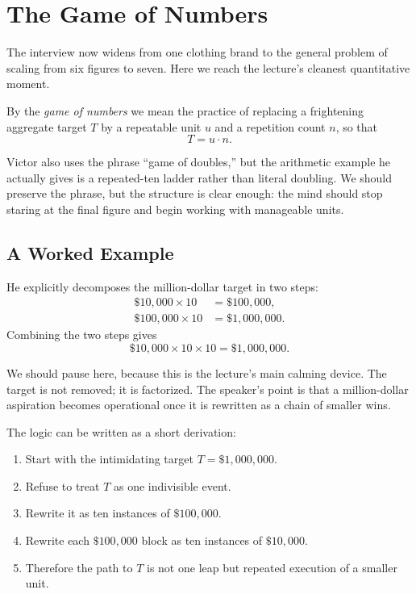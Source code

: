\section{The Game of Numbers}

The interview now widens from one clothing brand to the general problem of scaling from six figures to seven. Here we reach the lecture's cleanest quantitative moment.

\begin{definition}
By the \emph{game of numbers} we mean the practice of replacing a frightening aggregate target \(T\) by a repeatable unit \(u\) and a repetition count \(n\), so that
\begin{equation}
T = u \cdot n.
\end{equation}
\end{definition}

Victor also uses the phrase ``game of doubles,'' but the arithmetic example he actually gives is a repeated-ten ladder rather than literal doubling. We should preserve the phrase, but the structure is clear enough: the mind should stop staring at the final figure and begin working with manageable units.

\subsection{A Worked Example}

He explicitly decomposes the million-dollar target in two steps:
\begin{align}
\$10{,}000 \times 10 &= \$100{,}000, \\
\$100{,}000 \times 10 &= \$1{,}000{,}000.
\end{align}
Combining the two steps gives
\begin{equation}
\$10{,}000 \times 10 \times 10 = \$1{,}000{,}000.
\end{equation}

We should pause here, because this is the lecture's main calming device. The target is not removed; it is factorized. The speaker's point is that a million-dollar aspiration becomes operational once it is rewritten as a chain of smaller wins.

The logic can be written as a short derivation:
\begin{enumerate}
\item Start with the intimidating target \(T=\$1{,}000{,}000\).
\item Refuse to treat \(T\) as one indivisible event.
\item Rewrite it as ten instances of \(\$100{,}000\).
\item Rewrite each \(\$100{,}000\) block as ten instances of \(\$10{,}000\).
\item Therefore the path to \(T\) is not one leap but repeated execution of a smaller unit.
\end{enumerate}

